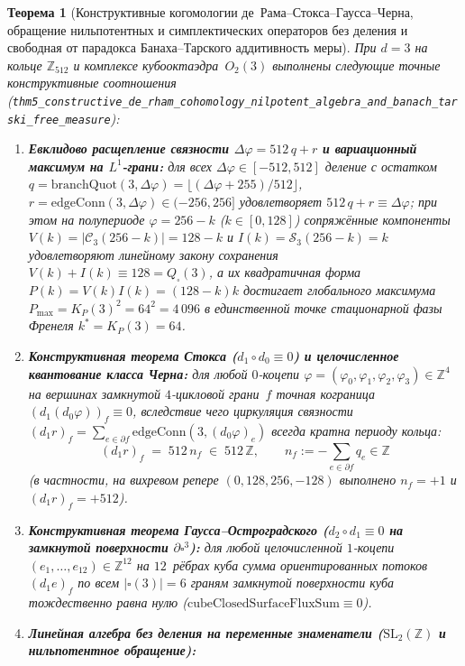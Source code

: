 \documentclass[11pt,a4paper]{article}
\theoremstyle{plain}
\newtheorem{theorem}{Теорема}[section]
\theoremstyle{definition}
\begin{document}
\begin{theorem}[Конструктивные когомологии де~Рама--Стокса--Гаусса--Черна, обращение нильпотентных и симплектических операторов без деления и свободная от парадокса Банаха--Тарского аддитивность меры]
\label{thm:main-5}
При $d=3$ на кольце $\mathbb{Z}_{512}$ и комплексе кубооктаэдра~$O_2(3)$ выполнены следующие точные конструктивные соотношения (\texttt{thm5\_constructive\_de\_rham\_cohomology\_nilpotent\_algebra\_and\_banach\_tarski\_free\_measure}):
\begin{enumerate}[label=\textbf{(\roman*)},leftmargin=*]
\item \textbf{Евклидово расщепление связности $\Delta\varphi = 512\,q + r$ и вариационный максимум на $L^1$-грани:}
  для всех $\Delta\varphi\in[-512,512]$ деление с остатком $q = \mathrm{branchQuot}(3,\Delta\varphi) = \lfloor(\Delta\varphi+255)/512\rfloor$, $r = \mathrm{edgeConn}(3,\Delta\varphi)\in(-256,256]$ удовлетворяет $512\,q + r \equiv \Delta\varphi$; при этом на полупериоде $\varphi = 256 - k$ ($k\in[0,128]$) сопряжённые компоненты $V(k) = |\mathcal{C}_3(256-k)| = 128-k$ и $I(k) = \mathcal{S}_3(256-k) = k$ удовлетворяют линейному закону сохранения $V(k)+I(k)\equiv 128 = Q_\square(3)$, а их квадратичная форма $P(k) = V(k)I(k) = (128-k)k$ достигает глобального максимума $P_{\max} = K_P(3)^2 = 64^2 = 4\,096$ в единственной точке стационарной фазы Френеля $k^* = K_P(3) = 64$.
\item \textbf{Конструктивная теорема Стокса ($d_1\circ d_0\equiv 0$) и целочисленное квантование класса Черна:}
  для любой $0$-коцепи $\varphi = (\varphi_0,\varphi_1,\varphi_2,\varphi_3)\in\mathbb{Z}^4$ на вершинах замкнутой $4$-цикловой грани~$f$ точная кограница $(d_1(d_0\varphi))_f \equiv 0$, вследствие чего циркуляция связности $(d_1 r)_f = \sum_{e\in\partial f}\mathrm{edgeConn}(3,(d_0\varphi)_e)$ всегда кратна периоду кольца:
  \[
    (d_1 r)_f \;=\; 512\,n_f \;\in\; 512\,\mathbb{Z},\qquad
    n_f := -\sum_{e\in\partial f} q_e \in \mathbb{Z}
  \]
  (в частности, на вихревом репере $(0,128,256,-128)$ выполнено $n_f = +1$ и $(d_1 r)_f = +512$).
\item \textbf{Конструктивная теорема Гаусса--Остроградского ($d_2\circ d_1\equiv 0$ на замкнутой поверхности $\partial\square^3$):}
  для любой целочисленной $1$-коцепи $(e_1,\dots,e_{12})\in\mathbb{Z}^{12}$ на $12$~рёбрах куба сумма ориентированных потоков $(d_1 e)_f$ по всем $|\square(3)|=6$ граням замкнутой поверхности куба тождественно равна нулю ($\mathrm{cubeClosedSurfaceFluxSum}\equiv 0$).
\item \textbf{Линейная алгебра без деления на переменные знаменатели ($\mathrm{SL}_2(\mathbb{Z})$ и нильпотентное обращение):}

\end{enumerate}
\end{theorem}
\end{document}
